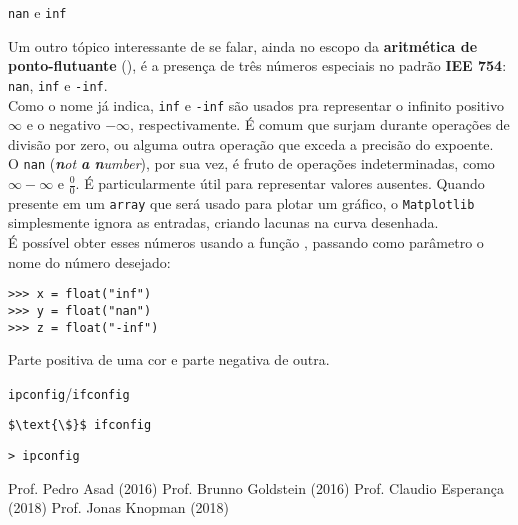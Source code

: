 \documentclass[12pt]{article}
\begin{document}
	
	
	
	\begin{interlude}{\texttt{nan} e \texttt{inf}}
	
	Um outro tópico interessante de se falar, ainda no escopo da \textbf{aritmética de ponto-flutuante} (), é a presença de três números especiais no padrão \textbf{IEE 754}: \texttt{nan}, \texttt{inf} e \texttt{-inf}.\\
	
	Como o nome já indica, \texttt{inf} e \texttt{-inf} são usados pra representar o infinito positivo $\infty$ e o negativo $-\infty$, respectivamente. É comum que surjam durante operações de divisão por zero, ou alguma outra operação que exceda a precisão do expoente.\\
	
	O \texttt{nan} (\textit{\textbf{n}ot \textbf{a} \textbf{n}umber}), por sua vez, é fruto de operações indeterminadas, como $\infty - \infty$ e $\frac{0}{0}$. É particularmente útil para representar valores ausentes. Quando presente em um \texttt{array} que será usado para plotar um gráfico, o \texttt{Matplotlib} simplesmente ignora as entradas, criando lacunas na curva desenhada.\\
	
	É possível obter esses números usando a função , passando como parâmetro o nome do número desejado:
	
	\begin{lstlisting}[caption='\texttt{nan} e \texttt{inf}']
>>> x = float("inf")
>>> y = float("nan")
>>> z = float("-inf")
	\end{lstlisting}
	
	\end{interlude}
	
	
	Parte positiva de uma cor e parte negativa de outra.	
	
	
	
	\begin{interlude}{\texttt{ipconfig}/\texttt{ifconfig}}
	
	\begin{lstlisting}
$\text{\$}$ ifconfig
	\end{lstlisting}
	
	\begin{lstlisting}
> ipconfig
	\end{lstlisting}	
	
	\end{interlude}
	
	\begin{thebibliography}{99}
	 Prof. Pedro Asad (2016)
	 Prof. Brunno Goldstein (2016)
	 Prof. Claudio Esperança (2018)
	 Prof. Jonas Knopman (2018)
	\end{thebibliography}
\end{document}
